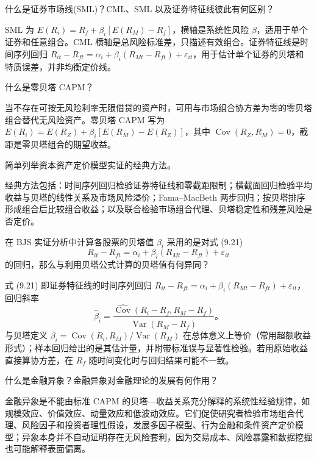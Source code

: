 \begin{problem}
 什么是证券市场线(SML)？CML、SML 以及证券特征线彼此有何区别？
\end{problem}
\begin{solution}
SML 为 $E(R_i)=R_f+\beta_i[E(R_M)-R_f]$，横轴是系统性风险 $\beta$，适用于单个证券和任意组合。CML 横轴是总风险标准差，只描述有效组合。证券特征线是时间序列回归 $R_{it}-R_{ft}=\alpha_i+\beta_i(R_{Mt}-R_{ft})+\varepsilon_{it}$，用于估计单个证券的贝塔和特质误差，并非均衡定价线。
\end{solution}
\begin{problem}
 什么是零贝塔 CAPM？
\end{problem}
\begin{solution}
当不存在可按无风险利率无限借贷的资产时，可用与市场组合协方差为零的零贝塔组合替代无风险资产。零贝塔 CAPM 写为 $E(R_i)=E(R_Z)+\beta_i[E(R_M)-E(R_Z)]$，其中 $\operatorname{Cov}(R_Z,R_M)=0$，截距是零贝塔组合的期望收益。
\end{solution}
\begin{problem}
 简单列举资本资产定价模型实证的经典方法。
\end{problem}
\begin{solution}
经典方法包括：时间序列回归检验证券特征线和零截距限制；横截面回归检验平均收益与贝塔的线性关系及市场风险溢价；Fama--MacBeth 两步回归；按贝塔排序形成组合后比较组合收益；以及联合检验市场组合代理、贝塔稳定性和残差风险是否定价。
\end{solution}
\begin{problem}
 在 BJS 实证分析中计算各股票的贝塔值 $\beta_i$ 采用的是对式 (9.21)
\[
    R_{it}-R_{ft}=\alpha_i+\beta_i(R_{Mt}-R_{ft})+\varepsilon_{it}
\]
的回归，那么与利用贝塔公式计算的贝塔值有何异同？
\end{problem}
\begin{solution}
式 (9.21) 即证券特征线的时间序列回归 $R_{it}-R_{ft}=\alpha_i+\beta_i(R_{Mt}-R_{ft})+\varepsilon_{it}$，回归斜率
\[
\hat\beta_i=\frac{\widehat{\operatorname{Cov}}(R_i-R_f,R_M-R_f)}{\widehat{\operatorname{Var}}(R_M-R_f)}。
\]
与贝塔定义 $\beta_i=\operatorname{Cov}(R_i,R_M)/\operatorname{Var}(R_M)$ 在总体意义上等价（常用超额收益形式）；样本回归给出的是其估计量，并附带标准误与显著性检验。若用原始收益直接算协方差，在 $R_f$ 随时间变化时与回归结果可能不一致。
\end{solution}
\begin{problem}
 什么是金融异象？金融异象对金融理论的发展有何作用？
\end{problem}
\begin{solution}
金融异象是不能由标准 CAPM 的贝塔—收益关系充分解释的系统性经验规律，如规模效应、价值效应、动量效应和低波动效应。它们促使研究者检验市场组合代理、风险因子和投资者理性假设，发展多因子模型、行为金融和条件资产定价模型；异象本身并不自动证明存在无风险套利，因为交易成本、风险暴露和数据挖掘也可能解释表面偏离。
\end{solution}

